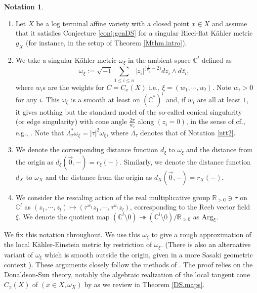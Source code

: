 \documentclass[12pt,a4paper]{amsart}
\theoremstyle{remark}
\theoremstyle{definition}
\newtheorem{ntt}{Notation}
\def\R{\mathbb{R}}
\def\C{\mathbb{C}}
\begin{document}
\begin{ntt}\label{ntt3}
\begin{enumerate}
\item Let $X$ be a log terminal affine variety with a closed point $x\in X$ and assume that it satisfies Conjecture 
\ref{conj:genDS} for a singular Ricci-flat K\"ahler metric $g_X$ 
(for instance, in the setup of Theorem \ref{Mthm.intro}). 

    \item 
We take a 
singular K\"ahler metric $\omega_\xi$ in the ambient space $\C^l$ 
defined as 
$$\omega_\xi:=\sqrt{-1}\sum_{1\le i\le n}
|z_i|^{\bigl(\frac{2}{w_i}-2\bigr)}
dz_i\wedge d\overline{z_i},$$ 
where $w_i$s are the weights for $C=C_x(X)$ i.e., 
$\xi=(w_1,\cdots,w_l)$. Note $w_i>0$ for any $i$. 
This $\omega_\xi$ is a smooth at least on 
$(\C^*)^l$ and, if $w_i$ are all at least $1$, it gives nothing but the standard model of 
the so-called conical singularity (or edge singularity) 
with cone angle 
$\frac{2\pi}{w_i}$ along $(z_i=0)$, 
in the sense of cf., e.g., \cite{Don11}. 
Note that $\Lambda_\tau^* \omega_\xi=|\tau|^{2}\omega_\xi$, 
where $\Lambda_\tau$ denotes that of Notation \ref{ntt2}. 

\item We denote the corresponding distance function $d_\xi$ to 
$\omega_{\xi}$ and the distance from the origin as 
$d_\xi(\vec{0},-)=r_\xi(-)$. 
Similarly, we denote the distance function $d_X$ to 
$\omega_{X}$ and the distance from the origin as 
$d_X(\vec{0},-)=r_X(-)$. 

\item 
We consider the rescaling action of the real multiplicative 
group $\R_{>0}\ni \tau$ on $\C^l$ 
as $(z_1,\cdots,z_l)\mapsto 
(\tau^{w_1}z_1,\cdots,\tau^{w_l}z_l)$, 
corresponding to the Reeb vector field $\xi$. 
We denote the quotient map 
$(\C^l\setminus 0)\twoheadrightarrow 
(\C^l\setminus 0)/\R_{>0}$ as ${\rm Arg}_{\xi}$. 
\end{enumerate}
\end{ntt}

We fix this notation throughout. 
We use this $\omega_\xi$ to give a rough approximation of 
the local K\"ahler-Einstein
metric by restriction of $\omega_\xi$. 
(There is also an alternative variant of $\omega_\xi$ which is smooth 
outside the origin, given in a more Sasaki geometric context 
\cite[\S 2.2, \S 2.3, Lemma 2.2]{HS}). 
These arguments closely follow 
the methods of \cite{SZ, Zha24}. The proof relies on the Donaldson-Sun 
theory, notably the algebraic realization of 
the local tangent cone $C_x(X)$ of $(x\in X,\omega_X)$ by \cite{DSII} 
as we review in Theorem \ref{DS.maps}. 
\end{document}

